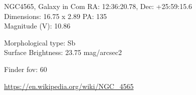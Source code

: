 \begin{block}{NGC4565, Galaxy in Com}
    RA: 12:36:20.78, Dec: +25:59:15.6 \\ 
    Dimensions: 16.75 x 2.89 PA: 135 \\ 
    Magnitude (V): 10.86

    Morphological type: Sb \\ 
    Surface Brightness: 23.75 mag/arcsec2 


    Finder fov: 60 

    \url{https://en.wikipedia.org/wiki/NGC_4565} 
\end{block}